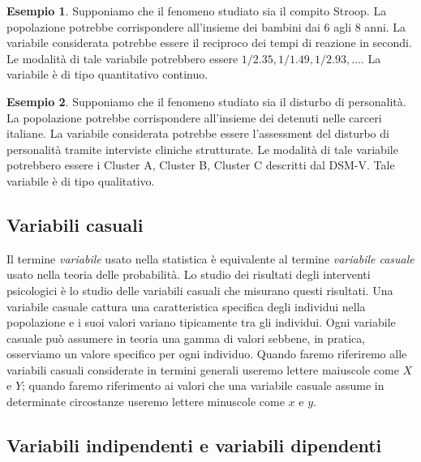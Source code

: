 \documentclass[
  11pt,
]{krantz}
\theoremstyle{definition}
\theoremstyle{definition}
\newtheorem{example}{Esempio}[chapter]
\theoremstyle{definition}
\theoremstyle{definition}
\theoremstyle{remark}
\begin{document}
\begin{example}
Supponiamo che il fenomeno studiato sia il compito Stroop. La popolazione potrebbe corrispondere all'insieme dei bambini dai 6 agli 8 anni. La variabile considerata potrebbe essere il reciproco dei tempi di reazione in secondi. Le modalità di tale variabile potrebbero essere \(1 / 2.35, 1/ 1.49, 1/2.93, \dots\). La variabile è di tipo quantitativo continuo.
\end{example}

\begin{example}
Supponiamo che il fenomeno studiato sia il disturbo di personalità. La popolazione potrebbe corrispondere all'insieme dei detenuti nelle carceri italiane. La variabile considerata potrebbe essere l'assessment del disturbo di personalità tramite interviste cliniche strutturate. Le modalità di tale variabile potrebbero essere i Cluster A, Cluster B, Cluster C descritti dal DSM-V. Tale variabile è di tipo qualitativo.
\end{example}

\hypertarget{variabili-casuali}{%
\subsection{Variabili casuali}\label{variabili-casuali}}

Il termine \emph{variabile} usato nella statistica è equivalente al termine \emph{variabile casuale} usato nella teoria delle probabilità. Lo studio dei risultati degli interventi psicologici è lo studio delle variabili casuali che misurano questi risultati. Una variabile casuale cattura una caratteristica specifica degli individui nella popolazione e i suoi valori variano tipicamente tra gli individui. Ogni variabile casuale può assumere in teoria una gamma di valori sebbene, in pratica, osserviamo un valore specifico per ogni individuo. Quando faremo riferiremo alle variabili casuali considerate in termini generali useremo lettere maiuscole come \(X\) e \(Y\); quando faremo riferimento ai valori che una variabile casuale assume in determinate circostanze useremo lettere minuscole come \(x\) e \(y\).

\hypertarget{variabili-indipendenti-e-variabili-dipendenti}{%
\subsection{Variabili indipendenti e variabili dipendenti}\label{variabili-indipendenti-e-variabili-dipendenti}}
\end{document}
